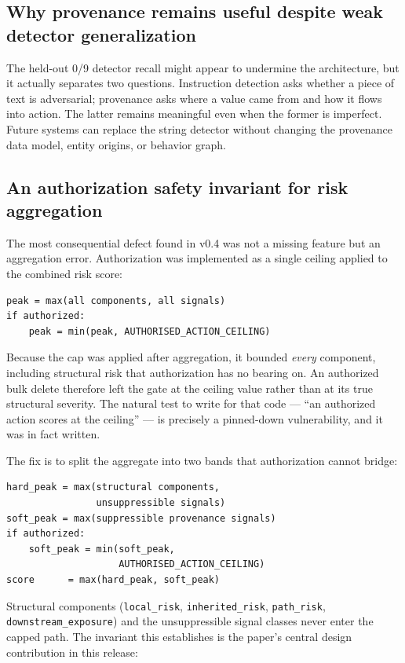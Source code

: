 \documentclass[letterpaper,twocolumn,10pt]{article}
\begin{document}
\subsection{Why provenance remains useful despite weak detector generalization}
\label{sec:disc:detector}

The held-out 0/9 detector recall might appear to undermine the architecture, but
it actually separates two questions. Instruction detection asks whether a piece
of text is adversarial; provenance asks where a value came from and how it flows
into action. The latter remains meaningful even when the former is imperfect.
Future systems can replace the string detector without changing the provenance
data model, entity origins, or behavior graph.

\subsection{An authorization safety invariant for risk aggregation}
\label{sec:invariant}

The most consequential defect found in v0.4 was not a missing feature but an
aggregation error. Authorization was implemented as a single ceiling applied to
the combined risk score:

{\small
\begin{verbatim}
peak = max(all components, all signals)
if authorized:
    peak = min(peak, AUTHORISED_ACTION_CEILING)
\end{verbatim}
}

Because the cap was applied after aggregation, it bounded \emph{every}
component, including structural risk that authorization has no bearing on. An
authorized bulk delete therefore left the gate at the ceiling value rather than
at its true structural severity. The natural test to write for that code ---
``an authorized action scores at the ceiling'' --- is precisely a pinned-down
vulnerability, and it was in fact written.

The fix is to split the aggregate into two bands that authorization cannot
bridge:

{\small
\begin{verbatim}
hard_peak = max(structural components,
                unsuppressible signals)
soft_peak = max(suppressible provenance signals)
if authorized:
    soft_peak = min(soft_peak,
                    AUTHORISED_ACTION_CEILING)
score      = max(hard_peak, soft_peak)
\end{verbatim}
}

Structural components (\texttt{local\_risk}, \texttt{inherited\_risk},
\texttt{path\_risk}, \texttt{downstream\_exposure}) and the unsuppressible
signal classes never enter the capped path. The invariant this establishes is
the paper's central design contribution in this release:
\end{document}
